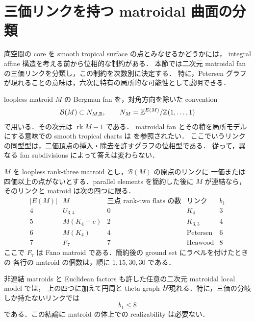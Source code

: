 \section{三価リンクを持つ matroidal 曲面の分類}
\label{trop:classification-section}

底空間の core を smooth tropical surface の点とみなせるかどうかには，
integral affine 構造を考える前から位相的な制約がある．
本節では二次元 matroidal fan の三価リンクを分類し，この制約を次数別に決定する．
特に，Petersen グラフが現れることの意味は，六次に特有の局所的な可能性として説明できる．

loopless matroid $M$ の Bergman fan を，対角方向を除いた convention
\[
 \mathcal B(M)\subset N_{M,\mathbb R},\qquad
 N_M=\mathbb Z^{E(M)}/\mathbb Z(1,\ldots,1)
\]
で用いる．その次元は $\operatorname{rk}M-1$ である．
matroidal fan とその積を局所モデルにする意味での smooth tropical charts は
\cite[\S2.4]{Shaw} を参照されたい．
ここでいうリンクの同型型は，二価頂点の挿入・除去を許すグラフの位相型である．
従って，異なる fan subdivisions によって答えは変わらない．

\begin{theorem}
\label{trop:cubic-classification}
$M$ を loopless rank-three matroid とし，$\mathcal B(M)$ の原点のリンクに
一価または四価以上の点がないとする．parallel elements を簡約した後に $M$ が連結なら，
そのリンクと matroid は次の四つに限る．
\[
\begin{array}{c|c|c|c|c}
 |E(M)|&M&\text{三点 rank-two flats の数}&\text{リンク}&b_1\\\hline
 4&U_{3,4}&0&K_4&3\\
 5&M(K_4-e)&2&K_{3,3}&4\\
 6&M(K_4)&4&\text{Petersen}&6\\
 7&F_7&7&\text{Heawood}&8
\end{array}
\]
ここで $F_7$ は Fano matroid である．簡約後の ground set にラベルを付けたときの
各行の matroid の個数は，順に $1,15,30,30$ である．

非連結 matroids と Euclidean factors も許した任意の二次元 matroidal local model では，
上の四つに加えて円周と theta graph が現れる．特に，三価の分岐しか持たないリンクでは
\begin{equation}\label{trop:genus-bound}
 b_1\leq8
\end{equation}
である．この結論に matroid の体上での realizability は必要ない．
\end{theorem}

